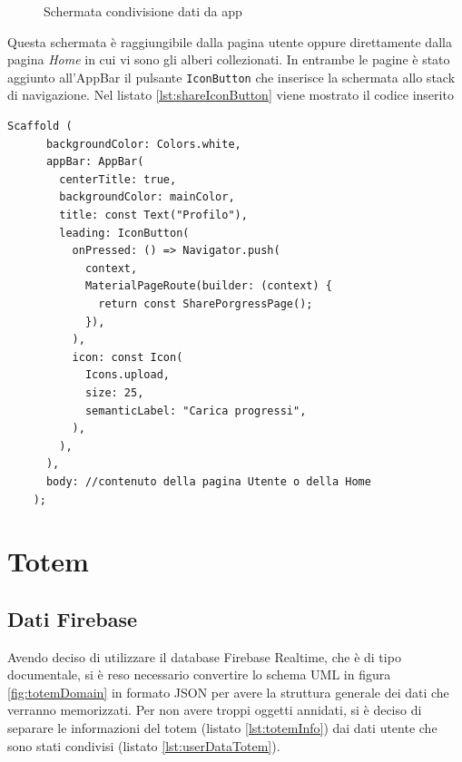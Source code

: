 \begin{figure}[h]
{        \label{fig:uploadinData}
    }
    \caption{Schermata condivisione dati da app}
    \label{fig:shareDataApp}
\end{figure}

Questa schermata è raggiungibile dalla pagina utente oppure direttamente dalla pagina \textit{Home} in cui vi sono gli alberi collezionati. In entrambe le pagine è stato aggiunto all'AppBar il pulsante \texttt{IconButton} che inserisce la schermata allo stack di navigazione. Nel listato \ref{lst:shareIconButton} viene mostrato il codice inserito

\begin{lstlisting}[style=FlutterStyle, caption=Python example, label={lst:shareIconButton}]
    Scaffold (
      backgroundColor: Colors.white,
      appBar: AppBar(
        centerTitle: true,
        backgroundColor: mainColor,
        title: const Text("Profilo"),
        leading: IconButton(
          onPressed: () => Navigator.push(
            context,
            MaterialPageRoute(builder: (context) {
              return const SharePorgressPage();
            }),
          ),
          icon: const Icon(
            Icons.upload,
            size: 25,
            semanticLabel: "Carica progressi",
          ),
        ),
      ),
      body: //contenuto della pagina Utente o della Home
    );
\end{lstlisting}


\section{Totem}
\subsection{Dati Firebase}

Avendo deciso di utilizzare il database Firebase Realtime, che è di tipo documentale, si è reso necessario convertire lo schema UML in figura \ref{fig:totemDomain} in formato JSON per avere la struttura generale dei dati che verranno memorizzati.
Per non avere troppi oggetti annidati, si è deciso di separare le informazioni del totem (listato \ref{lst:totemInfo}) dai dati utente che sono stati condivisi (listato \ref{lst:userDataTotem}).

